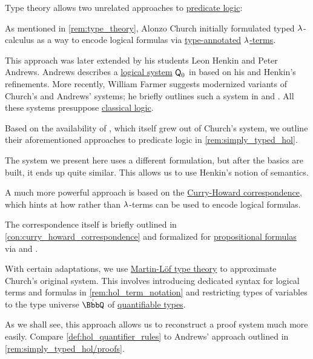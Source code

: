 \begin{remark}\label{rem:higher_order_logic_and_type_theory}
  Type theory allows two unrelated approaches to \hyperref[rem:predicate_logic]{predicate logic}:
  \begin{thmenum}
     As mentioned in \cref{rem:type_theory}, Alonzo Church initially formulated typed \( {\mathrm \lambda} \)-calculus as a way to encode logical formulas via \hyperref[con:type_annotation]{type-annotated} \hyperref[def:lambda_term]{\( {\mathrm \lambda} \)-terms}.

    This approach was later extended by his students Leon Henkin and Peter Andrews. Andrews describes a \hyperref[con:logical_system]{logical system} \( \textsf{\upshape Q}_0 \) in \cite[ch. 5]{Andrews2002Logic} based on his and Henkin's refinements. More recently, William Farmer suggests modernized variants of Church's and Andrews' systems; he briefly outlines such a system in \cite{Farmer2008STTVirtues} and \cite{Farmer1990PartialFunctionSTT}. All these systems presuppose \hyperref[con:classical_logic]{classical logic}.

    Based on the availability of , which itself grew out of Church's system, we outline their aforementioned approaches to predicate logic in \cref{rem:simply_typed_hol}.

    The system we present here uses a different formulation, but after the basics are built, it ends up quite similar. This allows us to use Henkin's notion of semantics.

     A much more powerful approach is based on the \hyperref[con:curry_howard_correspondence]{Curry-Howard correspondence}, which hints at how  rather than \( {\mathrm \lambda} \)-terms can be used to encode logical formulas.

    The correspondence itself is briefly outlined in \cref{con:curry_howard_correspondence} and formalized for \hyperref[def:propositional_syntax/formula]{propositional formulas} via  and .

    With certain adaptations, we use \hyperref[def:martin_lof_type_theory]{Martin-L\"of type theory} to approximate Church's original system. This involves introducing dedicated syntax for logical terms and formulas in \cref{rem:hol_term_notation} and restricting types of variables to the type universe \( \syn\BbbQ \) of \hyperref[def:hol_signature/universes/quant]{quantifiable types}.

    As we shall see, this approach allows us to reconstruct a proof system much more easily. Compare \cref{def:hol_quantifier_rules} to Andrews' approach outlined in \cref{rem:simply_typed_hol/proofs}.
  \end{thmenum}
\end{remark}

